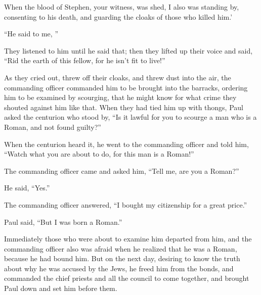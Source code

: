 {When the blood of Stephen, your witness, was shed, I also was standing by, consenting to his death, and guarding the cloaks of those who killed him.’
\par }{\PP {}“He said to me,
{}”
\par }{\PP {}They listened to him until he said that; then they lifted up their voice and said, “Rid the earth of this fellow, for he isn’t fit to live!”
\par }{\PP {}As they cried out, threw off their cloaks, and threw dust into the air,
the commanding officer commanded him to be brought into the barracks, ordering him to be examined by scourging, that he might know for what crime they shouted against him like that.
When they had tied him up with thongs, Paul asked the centurion who stood by, “Is it lawful for you to scourge a man who is a Roman, and not found guilty?”
\par }{\PP {}When the centurion heard it, he went to the commanding officer and told him, “Watch what you are about to do, for this man is a Roman!”
\par }{\PP {}The commanding officer came and asked him, “Tell me, are you a Roman?”
\par }{\PP He said, “Yes.”
\par }{\PP {}The commanding officer answered, “I bought my citizenship for a great price.”
\par }{\PP Paul said, “But I was born a Roman.”
\par }{\PP {}Immediately those who were about to examine him departed from him, and the commanding officer also was afraid when he realized that he was a Roman, because he had bound him.
But on the next day, desiring to know the truth about why he was accused by the Jews, he freed him from the bonds, and commanded the chief priests and all the council to come together, and brought Paul down and set him before them.

}
